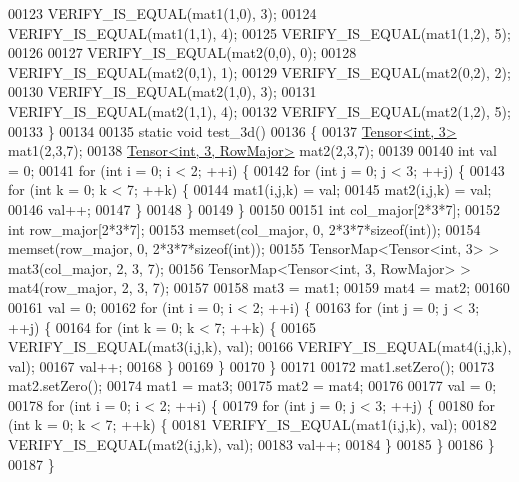\begin{DoxyCode}
00123   VERIFY\_IS\_EQUAL(mat1(1,0), 3);
00124   VERIFY\_IS\_EQUAL(mat1(1,1), 4);
00125   VERIFY\_IS\_EQUAL(mat1(1,2), 5);
00126 
00127   VERIFY\_IS\_EQUAL(mat2(0,0), 0);
00128   VERIFY\_IS\_EQUAL(mat2(0,1), 1);
00129   VERIFY\_IS\_EQUAL(mat2(0,2), 2);
00130   VERIFY\_IS\_EQUAL(mat2(1,0), 3);
00131   VERIFY\_IS\_EQUAL(mat2(1,1), 4);
00132   VERIFY\_IS\_EQUAL(mat2(1,2), 5);
00133 \}
00134 
00135 \textcolor{keyword}{static} \textcolor{keywordtype}{void} test\_3d()
00136 \{
00137   \hyperlink{class_eigen_1_1_tensor}{Tensor<int, 3>} mat1(2,3,7);
00138   \hyperlink{class_eigen_1_1_tensor}{Tensor<int, 3, RowMajor>} mat2(2,3,7);
00139 
00140   \textcolor{keywordtype}{int} val = 0;
00141   \textcolor{keywordflow}{for} (\textcolor{keywordtype}{int} i = 0; i < 2; ++i) \{
00142     \textcolor{keywordflow}{for} (\textcolor{keywordtype}{int} j = 0; j < 3; ++j) \{
00143       \textcolor{keywordflow}{for} (\textcolor{keywordtype}{int} k = 0; k < 7; ++k) \{
00144         mat1(i,j,k) = val;
00145         mat2(i,j,k) = val;
00146         val++;
00147       \}
00148     \}
00149   \}
00150 
00151   \textcolor{keywordtype}{int} col\_major[2*3*7];
00152   \textcolor{keywordtype}{int} row\_major[2*3*7];
00153   memset(col\_major, 0, 2*3*7*\textcolor{keyword}{sizeof}(\textcolor{keywordtype}{int}));
00154   memset(row\_major, 0, 2*3*7*\textcolor{keyword}{sizeof}(\textcolor{keywordtype}{int}));
00155   TensorMap<Tensor<int, 3> > mat3(col\_major, 2, 3, 7);
00156   TensorMap<Tensor<int, 3, RowMajor> > mat4(row\_major, 2, 3, 7);
00157 
00158   mat3 = mat1;
00159   mat4 = mat2;
00160 
00161   val = 0;
00162   \textcolor{keywordflow}{for} (\textcolor{keywordtype}{int} i = 0; i < 2; ++i) \{
00163     \textcolor{keywordflow}{for} (\textcolor{keywordtype}{int} j = 0; j < 3; ++j) \{
00164       \textcolor{keywordflow}{for} (\textcolor{keywordtype}{int} k = 0; k < 7; ++k) \{
00165         VERIFY\_IS\_EQUAL(mat3(i,j,k), val);
00166         VERIFY\_IS\_EQUAL(mat4(i,j,k), val);
00167         val++;
00168       \}
00169     \}
00170   \}
00171 
00172   mat1.setZero();
00173   mat2.setZero();
00174   mat1 = mat3;
00175   mat2 = mat4;
00176 
00177   val = 0;
00178   \textcolor{keywordflow}{for} (\textcolor{keywordtype}{int} i = 0; i < 2; ++i) \{
00179     \textcolor{keywordflow}{for} (\textcolor{keywordtype}{int} j = 0; j < 3; ++j) \{
00180       \textcolor{keywordflow}{for} (\textcolor{keywordtype}{int} k = 0; k < 7; ++k) \{
00181         VERIFY\_IS\_EQUAL(mat1(i,j,k), val);
00182         VERIFY\_IS\_EQUAL(mat2(i,j,k), val);
00183         val++;
00184       \}
00185     \}
00186   \}
00187 \}

\end{DoxyCode}

